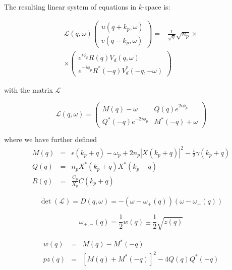 \documentclass[a4paper,prb,10pt,aps,twocolumn]{revtex4-1}
\begin{document}
The resulting linear system of equations in $k$-space is:

\begin{multline}
  \label{eq:35}
   \mathcal{L}(q,\omega)\begin{pmatrix}u(q+k_{p},\omega)\\
   v(q-k_{p},\omega)
\end{pmatrix}=-\frac{1}{\sqrt{g}}\sqrt{n_{p}}\times\\\times
\begin{pmatrix}e^{i\phi_{p}}R(q)V_{d}(q,\omega)\\
   e^{-i\phi_{p}}R^{*}(-q)V_{d}^{*}(-q,-\omega)
   \end{pmatrix}  
\end{multline}



with the matrix $\mathcal{L}$

\begin{equation}
  \label{eq:36}
   \mathcal{L}(q,\omega)=\begin{pmatrix}M(q)-\omega & Q(q)e^{2i\phi_{p}}\\
   Q^{*}(-q)e^{-2i\phi_{p}} & M^{*}(-q)+\omega
   \end{pmatrix}
\end{equation}


where we have further defined
\begin{subequations}
  \begin{eqnarray}
    \label{eq:107}
M(q)&=&\epsilon(k_{p}+q)-\omega_{p}+2n_{p}\left|X(k_{p}+q)\right|^{2}-\frac{i}{2}\gamma(k_{p}+q)\\
Q(q)&=&n_{p}X^{*}(k_{p}+q)X^{*}(k_{p}-q)\\
R(q)&=&\frac{C_{p}}{X_{p}}C(k_{p}+q)
  \end{eqnarray}
\end{subequations}


\begin{equation}
  \label{eq:40}
\det\left(\mathcal{L}\right)=D(q,\omega)=-\left(\omega-\omega_{+}(q)\right)\left(\omega-\omega_{-}(q)\right)
\end{equation}

\begin{equation}
  \label{eq:41}
   \omega_{+,-}(q)=\frac{1}{2}w(q)\pm\frac{1}{2}\sqrt{z(q)}
\end{equation}


\begin{subequations}
  \begin{eqnarray}
    \label{eq:108}
w(q)&=&M\left(q\right)-M^{*}\left(-q\right)\\
pz(q)&=&\left[M\left(q\right)+M^{*}\left(-q\right)\right]^{2}-4Q\left(q\right)Q^{*}\left(-q\right)
  \end{eqnarray}
\end{subequations}
\end{document}
